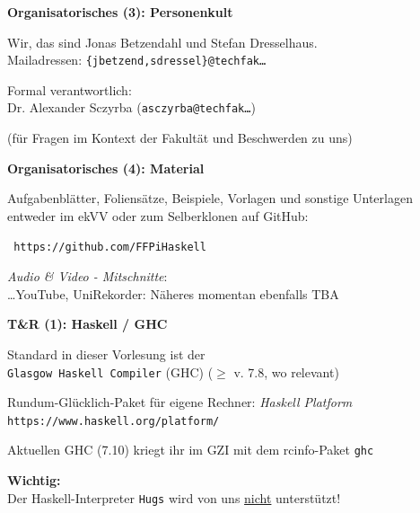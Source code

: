 \documentclass[unknownkeysallowed]{beamer}
\begin{document}
  
  \begin{frame}
    \Large\textbf{Organisatorisches (3): Personenkult}\bigskip \normalsize

	Wir, das sind Jonas Betzendahl und Stefan Dresselhaus.\\
	Mailadressen: \texttt{\{jbetzend,sdressel\}@techfak\dots}\\ \bigskip
    
    Formal verantwortlich:\\Dr. Alexander Sczyrba (\texttt{asczyrba@techfak\dots})
    
    (für Fragen im Kontext der Fakultät und Beschwerden zu uns)
  \end{frame}
  
  
  \begin{frame}
	\Large\textbf{Organisatorisches (4): Material}\bigskip \normalsize
	
	Aufgabenblätter, Foliensätze, Beispiele, Vorlagen und sonstige Unterlagen entweder im ekVV oder zum Selberklonen auf GitHub:
	
	\bigskip\texttt{    https://github.com/FFPiHaskell}\bigskip
	
	\emph{Audio \& Video - Mitschnitte}:\\ \dots YouTube, UniRekorder: Näheres momentan ebenfalls TBA
  \end{frame}
  
  
  \begin{frame}
    \Large\textbf{T\&R (1): Haskell / GHC}\bigskip \normalsize
    
    Standard in dieser Vorlesung ist der  \\ \texttt{Glasgow Haskell Compiler} (GHC)
    ($\geqslant$ v. 7.8, wo relevant) \pause \bigskip
    
    Rundum-Glücklich-Paket für eigene Rechner: \emph{Haskell Platform}\\
    \texttt{https://www.haskell.org/platform/} \pause \bigskip
    
    Aktuellen GHC (7.10) kriegt ihr im GZI mit dem rcinfo-Paket \texttt{ghc} \pause \smallskip
    
    \begin{important}
    \textbf{Wichtig:}\\Der Haskell-Interpreter \texttt{Hugs} wird von uns \underline{nicht} unterstützt!
    \end{important}
  \end{frame}
  
\end{document}
